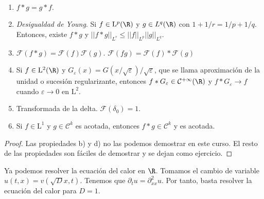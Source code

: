 \documentclass{article}
\begin{document}
\begin{proposition}~

  \begin{enumerate}
  \item $f * g = g*f$.
  \item \emph{Desigualdad de Young}. Si $f \in \mathrm{L}^p(\R)$ y $g \in L^q(\R)$ con
    $1+1/r = 1/p + 1/q$. Entonces, existe $f * g$ y $||f*g||_{L^r} \le ||f||_{L^p}||g||_{L^q}$.
  \item $\mathcal{F}(f*g) = \mathcal{F}(f) \mathcal{F}(g)$.
    $\mathcal{F}(fg) = \mathcal{F}(f) * \mathcal{F}(g)$
  \item Si $f \in \mathrm{L}^2(\R)$ y
    $G_{\varepsilon}(x) = G(x/ \sqrt{\varepsilon}) / \sqrt{\varepsilon}$, que se llama aproximación
    de la unidad o sucesión regularizante, entonces
    $f * G_{\varepsilon} \in \mathcal{C}^{+\infty}(\R)$ y $f * G_{\varepsilon} \to f$ cuando
    $\varepsilon \to 0$ en $\mathrm{L}^2$.
  \item Transformada de la delta. $\mathcal{F}(\delta_0) = 1$.
  \item Si $f\in \mathrm{L}^1$ y $g \in \mathcal{C}^k$ es acotada, entonces $f*g \in \mathcal{C}^k$
    y es acotada.
  \end{enumerate}
\end{proposition}
\begin{proof}
  Las propiedades b) y d) no las podemos demostrar en este curso. El resto de las propiedades son
  fáciles de demostrar y se dejan como ejercicio.
\end{proof}

Ya podemos resolver la ecuación del calor en $\R$. Tomamos el cambio de variable
$u(t,x) = v(\sqrt{D}x, t)$. Tenemos que $\partial_t u = \partial_{xx}^2 u$. Por tanto, basta
resolver la ecuación del calor para $D = 1$.
\end{document}
